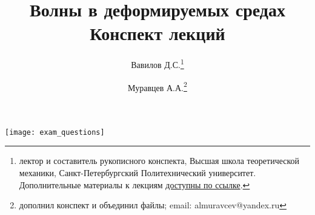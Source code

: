 \documentclass[a4paper,12pt]{article}
\begin{document}
	\tableofcontents
	\title{Волны в деформируемых средах\\Конспект лекций}
	\author{Вавилов Д.С.\thanks{лектор и составитель рукописного конспекта, Высшая школа теоретической механики, Санкт-Петербургский Политехнический университет. Дополнительные материалы к лекциям \href{https://csspbstu-my.sharepoint.com/:f:/g/personal/muravtsev_aa_edu_spbstu_ru/Epiacj6WFMBHqIF6E3YQgCMB7yi5NAA1ycqFLqrTZMhJ4w?e=i2agP0}{доступны по ссылке}.}
	\and
	Муравцев А.А.\thanks{дополнил конспект и объединил файлы; email: almuravcev@yandex.ru}}
	\maketitle
	\pagestyle{fancy}
	\begin{center}
	\texttt{[image: exam\_questions]}
	\end{center}
	\newpage
	
	\newpage
	
	\newpage
	
	\newpage
	
	\newpage
	
	\newpage
	
	\newpage
	
	\newpage
	
	\newpage
	
	\newpage
	
	\newpage
	
	\newpage
	
	\newpage
\end{document}

